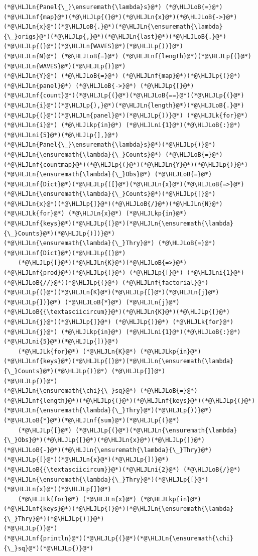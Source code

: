 \documentclass[12pt,a4paper]{article}
\newcommand{\HLJLk}[1]{\textcolor[RGB]{148,91,176}{\textbf{#1}}}
\newcommand{\HLJLkp}[1]{\textcolor[RGB]{148,91,176}{\textbf{#1}}}
\newcommand{\HLJLn}[1]{#1}
\newcommand{\HLJLnf}[1]{\textcolor[RGB]{66,102,213}{#1}}
\newcommand{\HLJLni}[1]{\textcolor[RGB]{59,151,46}{#1}}
\newcommand{\HLJLoB}[1]{\textcolor[RGB]{102,102,102}{\textbf{#1}}}
\newcommand{\HLJLp}[1]{#1}
\begin{document}
\begin{lstlisting}
(*@\HLJLn{Panel{\_}\ensuremath{\lambda}s}@*) (*@\HLJLoB{=}@*) (*@\HLJLnf{map}@*)(*@\HLJLp{(}@*)(*@\HLJLn{x}@*)(*@\HLJLoB{->}@*)(*@\HLJLn{x}@*)(*@\HLJLoB{.}@*)(*@\HLJLn{\ensuremath{\lambda}{\_}origs}@*)(*@\HLJLp{,}@*)(*@\HLJLn{last}@*)(*@\HLJLoB{.}@*)(*@\HLJLp{(}@*)(*@\HLJLn{WAVES}@*)(*@\HLJLp{))}@*)
(*@\HLJLn{N}@*) (*@\HLJLoB{=}@*) (*@\HLJLnf{length}@*)(*@\HLJLp{(}@*)(*@\HLJLn{WAVES}@*)(*@\HLJLp{)}@*)
(*@\HLJLn{Y}@*) (*@\HLJLoB{=}@*) (*@\HLJLnf{map}@*)(*@\HLJLp{(}@*)(*@\HLJLn{panel}@*) (*@\HLJLoB{->}@*) (*@\HLJLp{[}@*)(*@\HLJLnf{count}@*)(*@\HLJLp{(}@*)(*@\HLJLoB{==}@*)(*@\HLJLp{(}@*)(*@\HLJLn{i}@*)(*@\HLJLp{),}@*)(*@\HLJLn{length}@*)(*@\HLJLoB{.}@*)(*@\HLJLp{(}@*)(*@\HLJLn{panel}@*)(*@\HLJLp{))}@*) (*@\HLJLk{for}@*) (*@\HLJLn{i}@*) (*@\HLJLkp{in}@*) (*@\HLJLni{1}@*)(*@\HLJLoB{:}@*)(*@\HLJLni{5}@*)(*@\HLJLp{],}@*) (*@\HLJLn{Panel{\_}\ensuremath{\lambda}s}@*)(*@\HLJLp{)}@*)
(*@\HLJLn{\ensuremath{\lambda}{\_}Counts}@*) (*@\HLJLoB{=}@*) (*@\HLJLnf{countmap}@*)(*@\HLJLp{(}@*)(*@\HLJLn{Y}@*)(*@\HLJLp{)}@*)
(*@\HLJLn{\ensuremath{\lambda}{\_}Obs}@*) (*@\HLJLoB{=}@*) (*@\HLJLnf{Dict}@*)(*@\HLJLp{([}@*)(*@\HLJLn{x}@*)(*@\HLJLoB{=>}@*)(*@\HLJLn{\ensuremath{\lambda}{\_}Counts}@*)(*@\HLJLp{[}@*)(*@\HLJLn{x}@*)(*@\HLJLp{]}@*)(*@\HLJLoB{/}@*)(*@\HLJLn{N}@*) (*@\HLJLk{for}@*) (*@\HLJLn{x}@*) (*@\HLJLkp{in}@*) (*@\HLJLnf{keys}@*)(*@\HLJLp{(}@*)(*@\HLJLn{\ensuremath{\lambda}{\_}Counts}@*)(*@\HLJLp{)])}@*)
(*@\HLJLn{\ensuremath{\lambda}{\_}Thry}@*) (*@\HLJLoB{=}@*) (*@\HLJLnf{Dict}@*)(*@\HLJLp{(}@*)
	(*@\HLJLp{[}@*)(*@\HLJLn{K}@*)(*@\HLJLoB{=>}@*) (*@\HLJLnf{prod}@*)(*@\HLJLp{(}@*) (*@\HLJLp{[}@*) (*@\HLJLni{1}@*)(*@\HLJLoB{//}@*)(*@\HLJLp{(}@*) (*@\HLJLnf{factorial}@*)(*@\HLJLp{(}@*)(*@\HLJLn{K}@*)(*@\HLJLp{[}@*)(*@\HLJLn{j}@*)(*@\HLJLp{])}@*) (*@\HLJLoB{*}@*) (*@\HLJLn{j}@*)(*@\HLJLoB{{\textasciicircum}}@*)(*@\HLJLn{K}@*)(*@\HLJLp{[}@*)(*@\HLJLn{j}@*)(*@\HLJLp{]}@*) (*@\HLJLp{)}@*) (*@\HLJLk{for}@*) (*@\HLJLn{j}@*) (*@\HLJLkp{in}@*) (*@\HLJLni{1}@*)(*@\HLJLoB{:}@*)(*@\HLJLni{5}@*)(*@\HLJLp{])}@*) 
	(*@\HLJLk{for}@*) (*@\HLJLn{K}@*) (*@\HLJLkp{in}@*) (*@\HLJLnf{keys}@*)(*@\HLJLp{(}@*)(*@\HLJLn{\ensuremath{\lambda}{\_}Counts}@*)(*@\HLJLp{)}@*) (*@\HLJLp{]}@*)
(*@\HLJLp{)}@*)
(*@\HLJLn{\ensuremath{\chi}{\_}sq}@*) (*@\HLJLoB{=}@*) (*@\HLJLnf{length}@*)(*@\HLJLp{(}@*)(*@\HLJLnf{keys}@*)(*@\HLJLp{(}@*)(*@\HLJLn{\ensuremath{\lambda}{\_}Thry}@*)(*@\HLJLp{))}@*)(*@\HLJLoB{*}@*)(*@\HLJLnf{sum}@*)(*@\HLJLp{(}@*)
	(*@\HLJLp{[}@*) (*@\HLJLp{(}@*)(*@\HLJLn{\ensuremath{\lambda}{\_}Obs}@*)(*@\HLJLp{[}@*)(*@\HLJLn{x}@*)(*@\HLJLp{]}@*)(*@\HLJLoB{-}@*)(*@\HLJLn{\ensuremath{\lambda}{\_}Thry}@*)(*@\HLJLp{[}@*)(*@\HLJLn{x}@*)(*@\HLJLp{])}@*)(*@\HLJLoB{{\textasciicircum}}@*)(*@\HLJLni{2}@*) (*@\HLJLoB{/}@*) (*@\HLJLn{\ensuremath{\lambda}{\_}Thry}@*)(*@\HLJLp{[}@*)(*@\HLJLn{x}@*)(*@\HLJLp{]}@*)
	(*@\HLJLk{for}@*) (*@\HLJLn{x}@*) (*@\HLJLkp{in}@*) (*@\HLJLnf{keys}@*)(*@\HLJLp{(}@*)(*@\HLJLn{\ensuremath{\lambda}{\_}Thry}@*)(*@\HLJLp{)]}@*)
(*@\HLJLp{)}@*)
(*@\HLJLnf{println}@*)(*@\HLJLp{(}@*)(*@\HLJLn{\ensuremath{\chi}{\_}sq}@*)(*@\HLJLp{)}@*)
\end{lstlisting}
\end{document}
